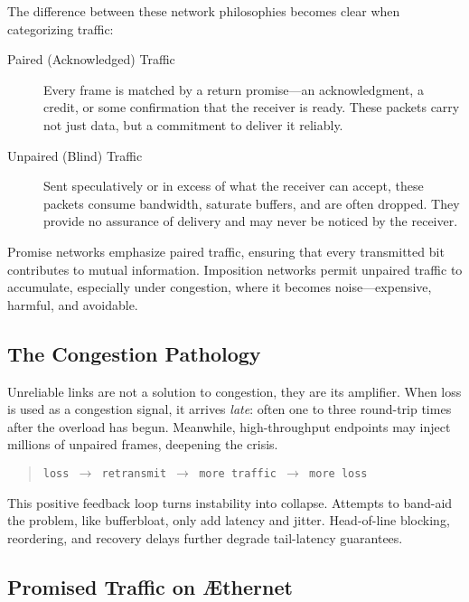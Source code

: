 \documentclass[../../../OAE-SPEC-MAIN.tex]{subfiles}
\begin{document}
The difference between these network philosophies becomes clear when categorizing traffic:

\begin{description}
  \item[Paired (Acknowledged) Traffic] Every frame is matched by a return promise—an acknowledgment, a credit, or some confirmation that the receiver is ready. These packets carry not just data, but a commitment to deliver it reliably.
  \item[Unpaired (Blind) Traffic] Sent speculatively or in excess of what the receiver can accept, these packets consume bandwidth, saturate buffers, and are often dropped. They provide no assurance of delivery and may never be noticed by the receiver.
\end{description}

Promise networks emphasize paired traffic, ensuring that every transmitted bit contributes to mutual information. Imposition networks permit unpaired traffic to accumulate, especially under congestion, where it becomes noise—expensive, harmful, and avoidable.

\subsection*{The Congestion Pathology}

Unreliable links are not a solution to congestion, they are its amplifier. When loss is used as a congestion signal, it arrives \emph{late}: often one to three round-trip times after the overload has begun. Meanwhile, high-throughput endpoints may inject millions of unpaired frames, deepening the crisis.

\begin{quote}
\centering
\texttt{loss $\rightarrow$ retransmit $\rightarrow$ more traffic $\rightarrow$ more loss}
\end{quote}

This positive feedback loop turns instability into collapse. Attempts to band-aid the problem, like bufferbloat, only add latency and jitter. Head-of-line blocking, reordering, and recovery delays further degrade tail-latency guarantees.

\subsection*{Promised Traffic on \AE thernet}
\end{document}
